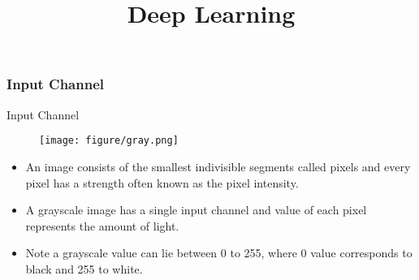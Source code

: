 




\newcommand{\titlefigure}{figure/stride4.png}
\newcommand{\learninggoals}{
  \item Input Channel
  \item Padding
  \item Stride
  \item Pooling

}

\title{Deep Learning}
\date{}






\frametitle{Input Channel}

\begin{vbframe}{Input Channel}
         \begin{figure}
    \centering
    \texttt{[image: figure/gray.png]}
  \end{figure}
    \begin{itemize}
    
       \item An image consists of the smallest indivisible segments called pixels and every pixel has a strength often known as the pixel intensity. 
       
       \item A grayscale image has a single input channel and value of each pixel represents the amount of light.
       
       \item Note a grayscale value can lie between 0 to 255, where 0 value corresponds to black and 255 to white.
       
       
    \end{itemize}

\end{vbframe}

